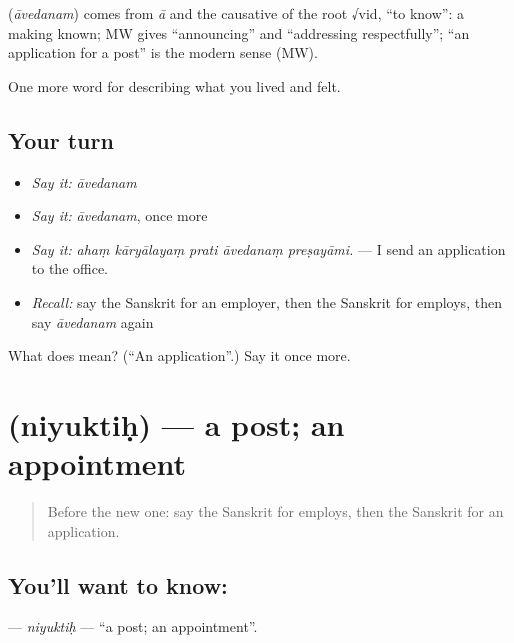 \begin{cousinweb}
\textbf{} (\emph{āvedanam}) comes from \emph{ā} and the causative of the root √vid, \textquotedblleft{}to know\textquotedblright{}: a making known; MW gives \textquotedblleft{}announcing\textquotedblright{} and \textquotedblleft{}addressing respectfully\textquotedblright{}; \textquotedblleft{}an application for a post\textquotedblright{} is the modern sense (MW).
\end{cousinweb}

\begin{grammarlens}[title={What you've built}]
One more word for describing what you lived and felt.
\end{grammarlens}

\subsection*{Your turn}
\begin{itemize}
\raggedright
  \item \emph{Say it:} \emph{āvedanam}
  \item \emph{Say it:} \emph{āvedanam}, once more
  \item \emph{Say it:} \emph{ahaṃ kāryālayaṃ prati āvedanaṃ preṣayāmi.} — I send an application to the office.
  \item \emph{Recall:} say the Sanskrit for an employer, then the Sanskrit for employs, then say \emph{āvedanam} again
\end{itemize}

\begin{tcolorbox}[breakable,colback=teal!4,colframe=teal!35!black,title={Before you move on}]
What does  mean? (\textquotedblleft{}An application\textquotedblright{}.) Say it once more.
\end{tcolorbox}
\section[\texorpdfstring{\sk{नियुक्तिः} (niyuktiḥ)}{नियुक्तिः (niyuktiḥ)}]{ (niyuktiḥ) — a post; an appointment}

\label{lesson:SA-C504-niyuktih}



\begin{quote}
Before the new one: say the Sanskrit for employs, then the Sanskrit for an application.
\end{quote}

\subsection*{You'll want to know: }
\textbf{} — \emph{niyuktiḥ} — \textquotedblleft{}a post; an appointment\textquotedblright{}.

